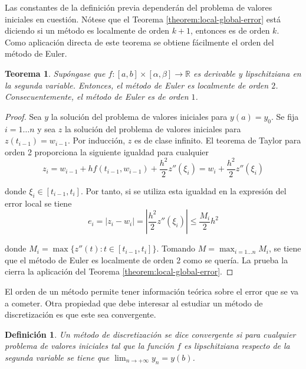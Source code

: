 \documentclass{article}
\theoremstyle{theorem-style}  %
\newtheorem{theorem}{Teorema}[section]  %
\theoremstyle{definition-style}
\newtheorem{definition}{Definición}[section]
\theoremstyle{example-style}
\begin{document}
	Las constantes de la definición previa dependerán del problema de valores iniciales en cuestión. Nótese que el Teorema \ref{theorem:local-global-error} está diciendo si un método es localmente de orden $k+1$, entonces es de orden $k$. Como aplicación directa de este teorema se obtiene fácilmente el orden del método de Euler.
	
	\begin{theorem} \label{theorem:euler:error}
		Supóngase que $f: [a,b] \times [\alpha, \beta] \rightarrow \mathbb{R}$ es derivable y lipschitziana en la segunda variable. Entonces, el método de Euler es localmente de orden $2$. Consecuentemente, el método de Euler es de orden $1$.
	\end{theorem}
	
	\begin{proof}
		Sea $y$ la solución del problema de valores iniciales para $y(a) = y_0$. Se fija $i = 1 \ldots n$ y sea $z$ la solución del problema de valores iniciales para $z(t_{i-1}) = w_{i-1}$. Por inducción, $z$ es de clase infinito. El teorema de Taylor para orden 2 proporciona la siguiente igualdad para cualquier 
		\begin{equation}
			z_i= w_{i-1} + h f(t_{i-1}, w_{i-1}) + \frac{h^2}{2} z''(\xi_i) = w_i + \frac{h^2}{2} z''(\xi_i)
		\end{equation}

		donde $\xi_i \in [t_{i-1}, t_i]$. Por tanto, si se utiliza esta igualdad en la expresión del error local se tiene
		\begin{equation}
			e_i = |z_i - w_i| = \left|\frac{h^2}{2} z''(\xi_i)\right| \le \frac{M_i}{2} h^2
		\end{equation}

		donde $M_i = \max\{z''(t) : t \in [t_{i-1}, t_i]\}$. Tomando $M = \max_{i = 1 \ldots n} M_i$, se tiene que el método de Euler es localmente de orden 2 como se quería. La prueba la cierra la aplicación del Teorema \ref{theorem:local-global-error}.
	\end{proof}

	El orden de un método permite tener información teórica sobre el error que se va a cometer. Otra propiedad que debe interesar al estudiar un método de discretización es que este sea convergente.

	\begin{definition}
		Un método de discretización se dice convergente si para cualquier problema de valores iniciales tal que la función $f$ es lipschitziana respecto de la segunda variable se tiene que $\lim_{n \rightarrow +\infty} y_n = y(b)$.
	\end{definition}
	
\end{document}
